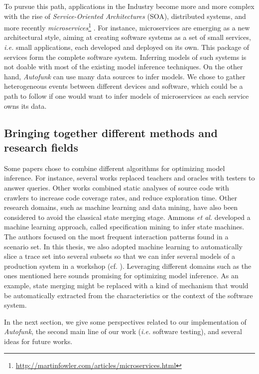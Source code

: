 To pursue this path, applications in the Industry become more and
more complex with the rise of \emph{Service-Oriented
Architectures} (SOA), distributed systems, and more recently
\emph{microservices}\footnote{\url{http://martinfowler.com/articles/microservices.html}}
\cite{thones2015microservices}.  For instance, microservices are
emerging as a new architectural style, aiming at creating
software systems as a set of small services, \emph{i.e.} small
applications, each developed and deployed on its own. This
package of services form the complete software system. Inferring
models of such systems is not doable with most of the existing
model inference techniques. On the other hand, \textit{Autofunk}
can use many data sources to infer models. We chose to gather
heterogeneous events between different devices and software,
which could be a path to follow if one would want to infer models
of microservices as each service owns its data.

\subsection{Bringing together different methods and research
fields}

Some papers chose to combine different algorithms for optimizing
model inference. For instance, several works
\cite{Alur:2005:SIS:1047659.1040314,Raffelt:2005:LLA:1081180.1081189,ngll11}
replaced teachers and oracles with testers to answer queries.
Other works \cite{Azim13,WPX13} combined static analyses of
source code with crawlers to increase code coverage rates, and
reduce exploration time. Other  research domains, such as machine
learning and data mining, have also been considered to avoid the
classical state merging stage. Ammons \emph{et al.}
\cite{Ammons:2002:MS:565816.503275} developed a machine learning
approach, called specification mining to infer state machines.
The authors focused on the most frequent interaction patterns
found in a scenario set. In this thesis, we also adopted machine
learning to automatically slice a trace set into several subsets
so that we can infer several models of a production system in a
workshop (cf.
).
Leveraging different domains such as the ones mentioned here
sounds promising for optimizing model inference. As an example,
state merging might be replaced with a kind of mechanism that
would be automatically extracted from the characteristics or the
context of the software system.

In the next section, we give some perspectives related to our
implementation of \emph{Autofunk}, the second main line of our
work (\emph{i.e.} software testing), and several ideas for future
works.

